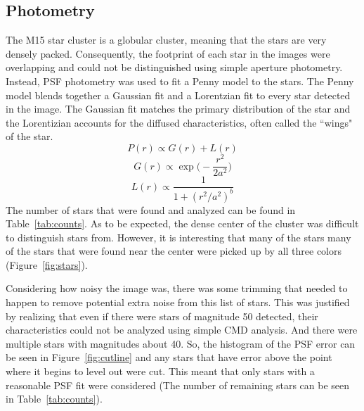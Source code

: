 \documentclass[twoside,11pt]{article}
\begin{document}
\subsection{Photometry}
The M15 star cluster is a globular cluster, meaning that the stars are very densely packed. Consequently, the footprint of each star in the images were overlapping and could not be distinguished using simple aperture photometry. Instead, PSF photometry was used to fit a Penny model to the stars. The Penny model blends together a Gaussian fit and a Lorentzian fit to every star detected in the image. The Gaussian fit matches the primary distribution of the star and the Lorentizian accounts for the diffused characteristics, often called the ``wings" of the star. 
\begin{equation*}
	\tag{Penny}
	P(r) \propto G(r) + L(r)
	\label{eq:penny}
\end{equation*}
\begin{equation*}
	\tag{Gaussian}
	G(r) \propto \exp\Big(-\frac{r^2}{2a^2}\Big)
	\label{eq:gaussian}
\end{equation*}
\begin{equation*}
	\tag{Lorentzian}
	L(r) \propto \frac{1}{1+(r^2/a^2)^b}
	\label{eq:lorentzian}
\end{equation*}
The number of stars that were found and analyzed can be found in Table~\ref{tab:counts}. As to be expected, the dense center of the cluster was difficult to distinguish stars from. However, it is interesting that many of the stars many of the stars that were found near the center were picked up by all three colors (Figure~\ref{fig:stars}). 

Considering how noisy the image was, there was some trimming that needed to happen to remove potential extra noise from this list of stars. This was justified by realizing that even if there were stars of magnitude 50 detected, their characteristics could not be analyzed using simple CMD analysis. And there were multiple stars with magnitudes about 40. So, the histogram of the PSF error can be seen in Figure~\ref{fig:cutline} and any stars that have error above the point where it begins to level out were cut. This meant that only stars with a reasonable PSF fit were considered (The number of remaining stars can be seen in Table~\ref{tab:counts}).
\end{document}
